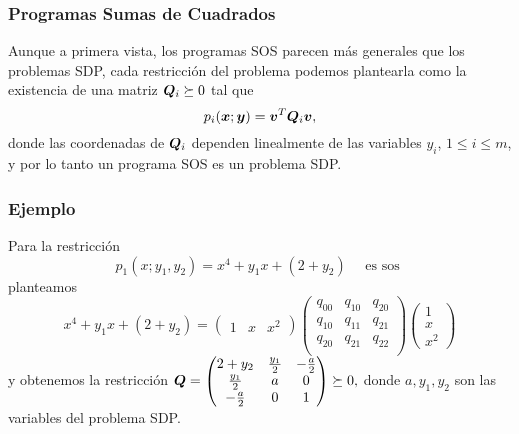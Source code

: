 \documentclass[aspectratio=169,12pt,spanish]{beamer}
\begin{document}

\begin{frame}

\frametitle{Programas Sumas de Cuadrados}

Aunque a primera vista, los programas SOS parecen más generales que los problemas SDP, cada restricción del problema podemos plantearla como la existencia de una matriz $\bm{Q}_i \succeq 0$ tal que
$$
p_i(\bm{x}; \bm{y}) = \bm{v}^T \bm{Q}_i \bm{v}, 
$$
donde las coordenadas de $\bm{Q}_i$ dependen linealmente de las variables $y_i$, $1 \le i \le m$, y por lo tanto un programa SOS es un problema SDP.
\end{frame}


\begin{frame}

\frametitle{Ejemplo}

Para la restricción 
$$p_1(x; y_1, y_2) = x^4 + y_1 x + (2+y_2) \quad \text{ es sos }
$$
planteamos
$$
x^4 + y_1 x + (2+y_2) = \begin{pmatrix} 1 & x & x^2 \end{pmatrix}
\begin{pmatrix}
q_{00} & q_{10} & q_{20} \\
q_{10} & q_{11} & q_{21} \\
q_{20} & q_{21} & q_{22} \\
\end{pmatrix}
\begin{pmatrix} 1 \\ x \\ x^2 \end{pmatrix}
$$
y obtenemos la restricción $\bm{Q} = 
\begin{pmatrix} 
2+y_2 & \frac{y_1}{2} & -\frac{a}{2} \\ 
\frac{y_1}{2} & a & 0 \\
-\frac{a}{2} & 0 & 1
\end{pmatrix} \succeq 0,
$ donde $a, y_1, y_2$ son las variables del problema SDP.


\end{frame}

\end{document}
